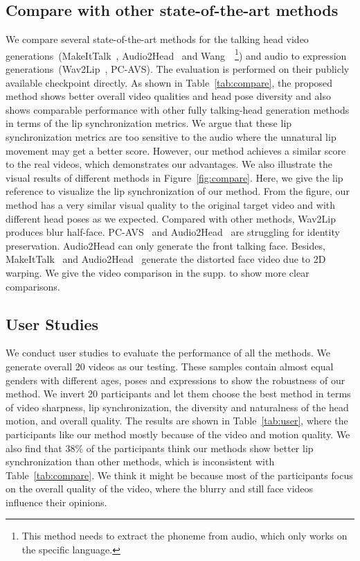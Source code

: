 \subsection{Compare with other state-of-the-art methods}
We compare several state-of-the-art methods for the talking head video generations~(MakeItTalk~\cite{zhou2020makelttalk}, Audio2Head~\cite{wang2021audio2head} and Wang~\etal\cite{wang2021one}~\footnote{This method needs to extract the phoneme from audio, which only works on the specific language.}) and audio to expression generations~(Wav2Lip~\cite{wav2lip}, PC-AVS\cite{pcavs}). 
The evaluation is performed on their publicly available checkpoint directly. As shown in Table~\ref{tab:compare}, the proposed method shows better overall video qualities and head pose diversity and also shows comparable performance with other fully talking-head generation methods in terms of the lip synchronization metrics. We argue that these lip synchronization metrics are too sensitive to the audio where the unnatural lip movement may get a better score.
However, our method achieves a similar score to the real videos, which demonstrates our advantages. We also illustrate the visual results of different methods in Figure~\ref{fig:compare}. Here, we give the lip reference to visualize the lip synchronization of our method.
From the figure, our method has a very similar visual quality to the original target video and with different head poses as we expected. Compared with other methods, Wav2Lip~\cite{wav2lip} produces blur half-face. PC-AVS~\cite{pcavs} and Audio2Head~\cite{wang2021audio2head} are struggling for identity preservation. Audio2Head can only generate the front talking face. Besides, MakeItTalk~\cite{zhou2020makelttalk} and Audio2Head~\cite{wang2021audio2head} generate the distorted face video due to 2D warping. We give the video comparison in the supp. to show more clear comparisons.




\subsection{User Studies}
We conduct user studies to evaluate the performance of all the methods. We generate overall 20 videos as our testing. These samples contain almost equal genders with different ages, poses and expressions to show the robustness of our method. We invert 20 participants and let them choose the best method in terms of video sharpness, lip synchronization, the diversity and naturalness of the head motion, and overall quality. The results are shown in Table~\ref{tab:user}, where the participants like our method mostly because of the video and motion quality. We also find that 38\% of the participants think our methods show better lip synchronization than other methods, which is inconsistent with Table~\ref{tab:compare}. We think it might be because most of the participants focus on the overall quality of the video, where the blurry and still face videos~\cite{pcavs, wav2lip} influence their opinions.

